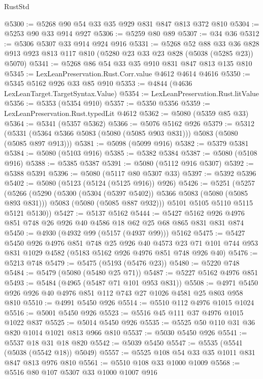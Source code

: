 \begin{lexlean}{RustStd}
\begin{coremodule}
@5300 := @5268 @90 @54 @33 @35 @929 @831 @847 @813 @372 @810
@5304 := @5253 @90 @33 @914 @927
@5306 := @5259 @80 @89
@5307 := @34 @36
@5312 := @5306 @5307 @33 @914 @924 @916
@5331 := @5268
    @52
    @88
    @33
    @36
    @828
    @913
    @923
    @813
    @117
    @810
    (@5280 @23 @33 @23 @828 (@5038 (@5285 @23)) @5070)
@5341 := @5268 @86 @54 @33 @35 @910 @831 @847 @813 @135 @810
@5345 := LexLeanPreservation.Rust.Corr.value @4612 @4614 @4616
@5350 := @5345 @5162 @926 @33 @85 @910
@5353 := @4844 (@4636 LexLeanTarget.TargetSyntax.Value)
@5354 := LexLeanPreservation.Rust.litValue
@5356 := @5353 (@5354 @910)
@5357 := @5350 @5356
@5359 := LexLeanPreservation.Rust.typedLit @4612
@5362 := @5080 (@5359 @85 @33)
@5364 := @5341 (@5357 @5362)
@5366 := @5076 @5162 @926
@5379 := @5312 (@5331 (@5364 @5366 @5083 (@5080 (@5085 @903 @831))) @5083 (@5080 (@5085 @897 @913)))
@5381 := @5098 (@5099 @916)
@5382 := @5379 @5381
@5384 := @5080 (@5103 @916)
@5385 := @5382 @5384
@5387 := @5080 (@5108 @916)
@5388 := @5385 @5387
@5391 := @5080 (@5112 @916 @5307)
@5392 := @5388 @5391
@5396 := @5080 (@5117 @80 @5307 @33)
@5397 := @5392 @5396
@5402 := @5080 (@5123 (@5124 (@5125 @916)) @926)
@5426 := @5251
    (@5257
      (@5266
        (@5290
          (@5300 (@5304 (@5397 @5402)) @5366 @5083 (@5080 (@5085 @893 @831)))
          @5083
          (@5080 (@5085 @887 @932)))
        @5101
        @5105
        @5110
        @5115
        @5121
        @5130))
@5427 := @5137 @5162
@5444 := @5427 @5162 @926 @4976 @851 @748 @26 @926 @40 @4586 @18 @62 @25 @68 @865 @831 @831 @874
@5450 := @4930 (@4932 @99 (@5157 (@4937 @99))) @5162
@5475 := @5427
    @5450
    @926
    @4976
    @851
    @748
    @25
    @926
    @40
    @4573
    @23
    @71
    @101
    @744
    @953
    @831
    @1029
    @4582
    (@5183 @5162 @926 @4976 @851 @748 @926 @40)
@5476 := @5213 @748
@5479 := @5475 (@5193 (@5476 @23))
@5480 := @5220 @748
@5484 := @5479 (@5080 (@5480 @25 @71))
@5487 := @5227 @5162 @4976 @851
@5493 := @5484 (@4965 (@5487 @71 @101 @953 @831))
@5508 := @4971 @5450 @926 @926 @40 @4976 @851 @112 @743 @27 @1026 @4581 @25 @803 @958 @810
@5510 := @4991 @5450 @926
@5514 := @5510 @112 @4976 @1015 @1024
@5516 := @5001 @5450 @926
@5523 := @5516 @45 @111 @37 @4976 @1015 @1022 @837
@5525 := @5014 @5450 @926
@5535 := @5525 @50 @110 @31 @36 @820 @1014 @1021 @813 @966 @810
@5537 := @5030 @5450 @926
@5541 := @5537 @18 @31 @18 @820
@5542 := @5039 @5450
@5547 := @5535 (@5541 (@5038 (@5542 @18)) @5049)
@5557 := @5525 @108 @54 @33 @35 @1011 @831 @847 @813 @976 @810
@5561 := @5510 @108 @33 @1000 @1009
@5568 := @5516 @80 @107 @5307 @33 @1000 @1007 @916

\end{coremodule}
\end{lexlean}
